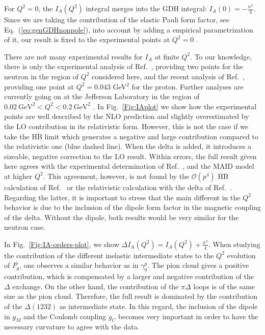 \documentclass[twocolumn,prc,showpacs,nofootinbib,preprintnumbers,amsmath,amssymb,superscriptaddress]{revtex4-1}
\def\Eqref#1{Eq.~(\ref{eq:#1})}
\begin{document}
For $Q^2=0$, the $I_A(Q^2)$ integral merges into the GDH integral: $I_A (0) = - \frac{\kappa^2}{4}$.
Since we are taking the contribution of the elastic Pauli form factor, see \Eqref{genGDHnonpole}, into account by adding a empirical parametrization of it, our result is fixed to the experimental points at $Q^2=0$ \cite{Mohr:2012tt}.

There are not many experimental results for $I_A$ at finite $Q^2$.
To our knowledge, there is only the experimental analysis of Ref.~\cite{Amarian:2002ar}, providing two points for the neutron in the region of $Q^2$ considered here, and the recent analysis of Ref.~\cite{Zielinski:2017gwp}, providing one point at $Q^2=0.043$ GeV$^2$ for the proton.
Further analyses are currently going on at the Jefferson Laboratory in the region of $0.02~\text{GeV}^2<Q^2<0.2~\text{GeV}^2$ \cite{Exp-new-E08-027,Zielinski:2017gwp,Exp-new-E97-110}. 
In Fig.~\ref{Fig:IAplot} we show how the experimental points are well described by the NLO prediction and slightly overestimated by the LO contribution in its relativistic form.
However, this is not the case if we take the HB limit which generates a negative and large contribution compared to the relativistic one (blue dashed line).
When the delta is added, it introduces a sizeable, negative correction to the LO result.
Within errors, the full result given here agrees with the experimental determination of Ref.~\cite{Amarian:2002ar}, and the MAID model at higher $Q^2$. 
This agreement, however, is not found by the $\mathcal{O}(p^4)$ HB calculation of Ref.~\cite{Kao:2002cp} or the relativistic calculation with the delta of Ref.~\cite{Bernard:2012hb}.
Regarding the latter, it is important to stress that the main different in the $Q^2$ behavior is due to the inclusion of the dipole form factor in the magnetic coupling of the delta.
Without the dipole, both results would be very similar for the neutron case.

In Fig.~\ref{Fig:IA-orders-plot}, we show $\Delta I_A(Q^2)=I_A(Q^2)+\frac{\kappa^2}{4}$.
When studying the contribution of the different inelastic intermediate states to the $Q^2$ evolution of $I_A^p$, one observes a similar behavior as in $\gamma_0^p$. 
The pion cloud gives a positive contribution, which is compensated by a larger and negative contribution of the $\Delta$ exchange.
On the other hand, the contribution of the $\pi \Delta$ loops is of the same size as the pion cloud. 
Therefore, the full result is dominated by the contribution of the $\Delta(1232)$ as intermediate state.
In this regard, the inclusion of the dipole in $g_M$ and the Coulomb coupling $g_C$ becomes very important in order to have the necessary curvature to agree with the data.
\end{document}

